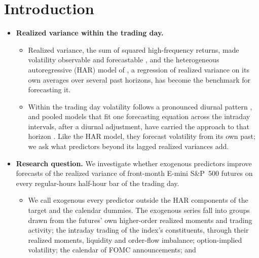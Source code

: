 \section{Introduction}
\label{sec:rh_intro}
\begin{itemize}
\item \textbf{Realized variance within the trading day.}
  \begin{itemize}
  \item Realized variance, the sum of squared high-frequency returns, made volatility observable and forecastable
    \citep{AndersenBollerslevDieboldLabys2003, BarndorffNielsenShephard2002}, and the heterogeneous autoregressive
    (HAR) model of \citet{Corsi2009}, a regression of realized variance on its own averages over several past
    horizons, has become the benchmark for forecasting it.
  \item Within the trading day volatility follows a pronounced diurnal pattern \citep{AndersenBollerslev1997}, and
    pooled models that fit one forecasting equation across the intraday intervals, after a diurnal adjustment, have
    carried the approach to that horizon \citep{EngleSokalska2012,ZhangZhangCucuringuQian2024}. Like the HAR model,
    they forecast volatility from its own past; we ask what predictors beyond its lagged realized variances add.
  \end{itemize}
\item \textbf{Research question.} We investigate whether exogenous predictors improve forecasts of the
  realized variance of front-month E-mini S\&P~500 futures on every regular-hours half-hour bar of the trading day.
  \begin{itemize}
  \item We call exogenous every predictor outside the HAR components of the target and the calendar dummies. The
    \rhdmNSeriesPooled{} exogenous series fall into \bkNBuckets{} groups drawn from the futures' own higher-order
    realized moments and trading activity; the intraday trading of the index's constituents, through their realized
    moments, liquidity and order-flow imbalance; option-implied volatility; the calendar of FOMC announcements; and

\end{itemize}
\end{itemize}
